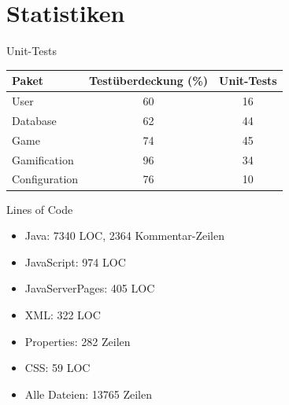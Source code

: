 \documentclass[xcolor=dvipsnames]{beamer}
\begin{document}
\renewcommand{\arraystretch}{1.5}

\section{Statistiken}
\begin{frame}{Unit-Tests}
  \begin{center}
    \begin{tabular}{ | l | c | c | }
      \hline
      Paket & Testüberdeckung (\%) & Unit-Tests \\ \hline
      User & 60 & 16 \\
      Database & 62 & 44 \\
      Game & 74 & 45 \\
      Gamification & 96 & 34 \\
      Configuration & 76 & 10 \\
      \hline
    \end{tabular}
  \end{center}
\end{frame}

\begin{frame}{Lines of Code}
  \begin{itemize}
    \item Java: 7340 LOC, 2364 Kommentar-Zeilen \\
    \item JavaScript: 974 LOC \\
    \item JavaServerPages: 405 LOC \\
    \item XML: 322 LOC \\
    \item Properties: 282 Zeilen \\
    \item CSS: 59 LOC \\
    \item Alle Dateien: 13765 Zeilen \\
  \end{itemize}
\end{frame}
\end{document}
